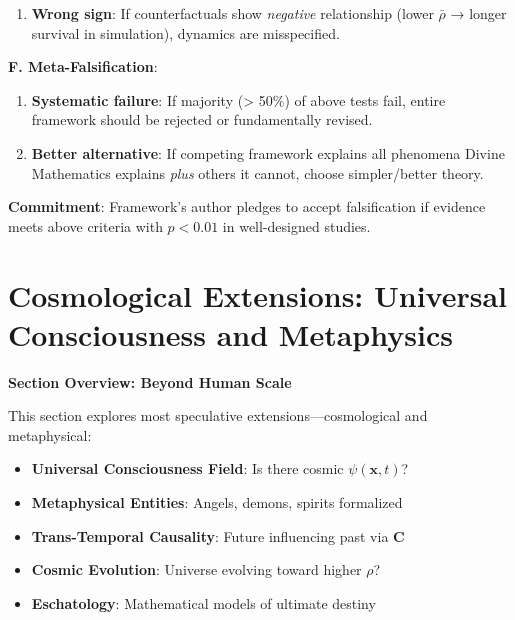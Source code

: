 \documentclass[11pt,a4paper]{article}
\theoremstyle{definition}
\theoremstyle{remark}
\begin{document}
\begin{small}
\begin{enumerate}
\begin{mdframed}[backgroundcolor=red!10,linewidth=2pt,linecolor=red!70!black]
\begin{enumerate}
    \item \textbf{Wrong sign}: If counterfactuals show \textit{negative} relationship (lower \(\bar{\rho}\) → longer survival in simulation), dynamics are misspecified.
\end{enumerate}

\textbf{F. Meta-Falsification}:
\begin{enumerate}
    \item \textbf{Systematic failure}: If majority (> 50\%) of above tests fail, entire framework should be rejected or fundamentally revised.
    
    \item \textbf{Better alternative}: If competing framework explains all phenomena Divine Mathematics explains \textit{plus} others it cannot, choose simpler/better theory.
\end{enumerate}

\textbf{Commitment}: Framework's author pledges to accept falsification if evidence meets above criteria with \(p < 0.01\) in well-designed studies.
\end{mdframed}


\section{Cosmological Extensions: Universal Consciousness and Metaphysics}

\begin{mdframed}[backgroundcolor=cyan!5,linewidth=2pt]
\textbf{Section Overview: Beyond Human Scale}

This section explores most speculative extensions—cosmological and metaphysical:

\begin{itemize}[nosep]
    \item \textbf{Universal Consciousness Field}: Is there cosmic \(\psi(\mathbf{x}, t)\)?
    \item \textbf{Metaphysical Entities}: Angels, demons, spirits formalized
    \item \textbf{Trans-Temporal Causality}: Future influencing past via \(\mathbf{C}\)
    \item \textbf{Cosmic Evolution}: Universe evolving toward higher \(\rho\)?
    \item \textbf{Eschatology}: Mathematical models of ultimate destiny
\end{itemize}


\end{mdframed}
\end{enumerate}
\end{small}
\end{document}
